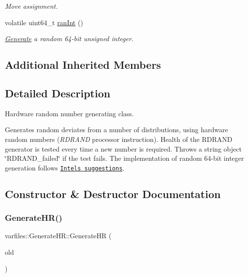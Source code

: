 \begin{DoxyCompactItemize}
\begin{DoxyCompactList}\small\item\em Move assignment. \end{DoxyCompactList}\item 
volatile uint64\+\_\+t \hyperlink{classvarfiles_1_1_generate_h_r_ac0c560c9ea17bc67470124040e0bd796}{ran\+Int} ()
\begin{DoxyCompactList}\small\item\em \hyperlink{classvarfiles_1_1_generate}{Generate} a random 64-\/bit unsigned integer. \end{DoxyCompactList}\end{DoxyCompactItemize}
\subsection*{Additional Inherited Members}


\subsection{Detailed Description}
Hardware random number generating class. 

Generates random deviates from a number of distributions, using hardware random numbers ({\itshape R\+D\+R\+A\+ND} processor instruction). Health of the R\+D\+R\+A\+ND generator is tested every time a new number is required. Throws a {\ttfamily string} object \char`\"{}\+R\+D\+R\+A\+N\+D\+\_\+failed\char`\"{} if the test fails. The implementation of random 64-\/bit integer generation follows \href{https://software.intel.com/en-us/articles/intel-digital-random-number-generator-drng-software-implementation-guide}{\tt Intel\textquotesingle{}s suggestions}. 

\subsection{Constructor \& Destructor Documentation}
\mbox{\label{classvarfiles_1_1_generate_h_r_af6739babad28f72258c4e10fe937aa23}} 
\subsubsection{\texorpdfstring{Generate\+H\+R()}{GenerateHR()}\hspace{0.1cm}{\footnotesize\ttfamily [1/2]}}
{\footnotesize\ttfamily varfiles\+::\+Generate\+H\+R\+::\+Generate\+HR (\begin{DoxyParamCaption}\item[{const \hyperlink{classvarfiles_1_1_generate_h_r}{Generate\+HR} \&}]{old }\end{DoxyParamCaption})\hspace{0.3cm}{\ttfamily [inline]}}




